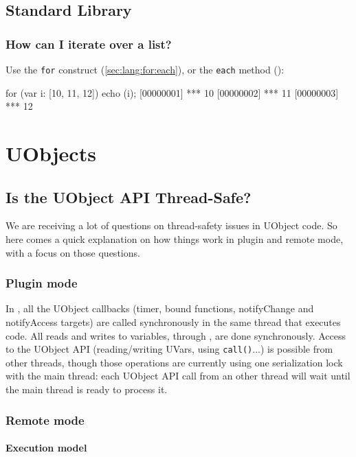 \subsection{Standard Library}

\subsubsection{How can I iterate over a list?}
Use the \lstinline{for} construct (\autoref{sec:lang:for:each}), or
the \lstinline|each| method ():

\begin{urbiscript}
for (var i: [10, 11, 12]) echo (i);
[00000001] *** 10
[00000002] *** 11
[00000003] *** 12
\end{urbiscript}

\section{UObjects}
\subsection{Is the UObject API Thread-Safe?}
We are receiving a lot of questions on thread-safety issues in UObject
code. So here comes a quick explanation on how things work in plugin
and remote mode, with a focus on those questions.

\subsubsection{Plugin mode}

In , all the UObject callbacks (timer, bound
functions, notifyChange and notifyAccess targets) are called
synchronously in the same thread that executes \us code. All reads and
writes to \urbi variables, through , are done
synchronously. Access to the UObject API (reading/writing UVars, using
\lstinline|call()|...) is possible from other threads, though those
operations are currently using one serialization lock with the main
thread: each UObject API call from an other thread will wait until the
main thread is ready to process it.


\subsubsection{Remote mode}

\paragraph{Execution model}

